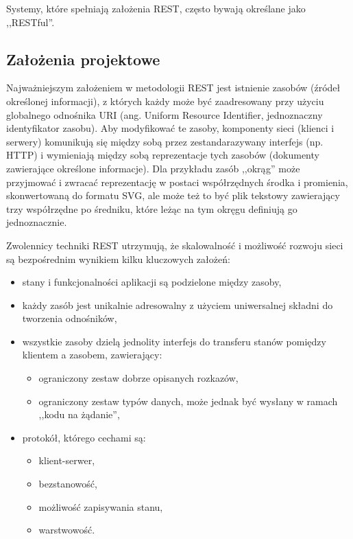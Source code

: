 \documentclass[a4paper,12pt,oneside]{report}
\begin{document}
Systemy, które spełniają założenia REST, często bywają określane jako ,,RESTful''.

\subsection{Założenia projektowe}
\label{sub:rest-zalozenia}
Najważniejszym założeniem w metodologii REST jest istnienie zasobów (źródeł określonej informacji), z których każdy może być zaadresowany przy użyciu globalnego odnośnika URI (ang. Uniform Resource Identifier, jednoznaczny identyfikator zasobu). Aby modyfikować te zasoby, komponenty sieci (klienci i serwery) komunikują się między sobą przez zestandarazywany interfejs (np. HTTP) i wymieniają między sobą reprezentacje tych zasobów (dokumenty zawierające określone informacje). Dla przykładu zasób ,,okrąg'' może przyjmować i zwracać reprezentację w postaci współrzędnych środka i promienia, skonwertowaną do formatu SVG, ale może też to być plik tekstowy zawierający trzy współrzędne po średniku, które leżąc na tym okręgu definiują go jednoznacznie.

Zwolennicy techniki REST utrzymują, że skalowalność i możliwość rozwoju sieci są bezpośrednim wynikiem kilku kluczowych założeń:
\begin{itemize}
  \item stany i funkcjonalności aplikacji są podzielone między zasoby,
  \item każdy zasób jest unikalnie adresowalny z użyciem uniwersalnej składni do tworzenia odnośników,
  \item wszystkie zasoby dzielą jednolity interfejs do transferu stanów pomiędzy klientem a zasobem, zawierający:
  \begin{itemize}
    \item ograniczony zestaw dobrze opisanych rozkazów,
    \item ograniczony zestaw typów danych, może jednak być wysłany w ramach ,,kodu na żądanie'',
  \end{itemize}
  \item protokół, którego cechami są:
  \begin{itemize}
    \item klient-serwer,
    \item bezstanowość,
    \item możliwość zapisywania stanu,
    \item warstwowość.
  \end{itemize}
\end{itemize}
\end{document}
